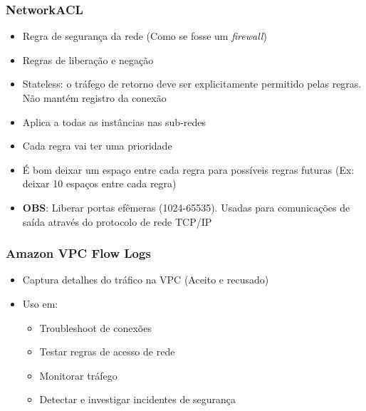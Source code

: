 \begin{frame}[allowframebreaks]
	\frametitle{NetworkACL}
	\begin{itemize}
		\item Regra de segurança da rede (Como se fosse um \textit{firewall})
		\item Regras de liberação e negação
		\item Stateless: o tráfego de retorno deve ser explicitamente permitido pelas regras. Não mantém registro da conexão
		\item Aplica a todas as instâncias nas sub-redes
		\framebreak
		\item Cada regra vai ter uma prioridade
		\item É bom deixar um espaço entre cada regra para possíveis regras futuras (Ex: deixar 10 espaços entre cada regra)
		\item \textbf{OBS}: Liberar portas efêmeras (1024-65535). Usadas para comunicações de saída através do protocolo de rede TCP/IP
	\end{itemize}
\end{frame}

\begin{frame}
	\frametitle{Amazon VPC Flow Logs}
	\begin{itemize}
		\item Captura detalhes do tráfico na VPC (Aceito e recusado)
		\item Uso em:
			\begin{itemize}
				\item Troubleshoot de conexões
				\item Testar regras de acesso de rede
				\item Monitorar tráfego
				\item Detectar e investigar incidentes de segurança
			\end{itemize}
	\end{itemize}
\end{frame}

